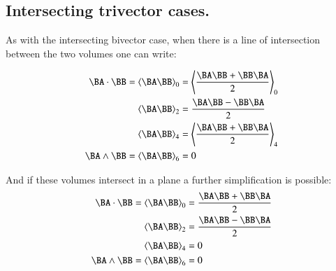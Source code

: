 \subsection{Intersecting trivector cases. }

As with the intersecting bivector case, when there is a line of intersection between the two volumes one can
write:

\begin{align*}
\BA \cdot \BB = \gpgrade{\BA\BB}{0} &= \gpgrade{\frac{\BA\BB + \BB\BA}{2}}{0} \\
\gpgrade{\BA\BB}{2} &= \frac{\BA\BB - \BB\BA}{2} \\
\gpgrade{\BA\BB}{4} &= \gpgrade{\frac{\BA\BB + \BB\BA}{2}}{4} \\
\BA \wedge \BB = \gpgrade{\BA\BB}{6} &= 0 \\
\end{align*}

And if these volumes intersect in a plane a further simplification is possible:
\begin{align*}
\BA \cdot \BB = \gpgrade{\BA\BB}{0} &= \frac{\BA\BB + \BB\BA}{2} \\
\gpgrade{\BA\BB}{2} &= \frac{\BA\BB - \BB\BA}{2} \\
\gpgrade{\BA\BB}{4} &= 0 \\
\BA \wedge \BB = \gpgrade{\BA\BB}{6} &= 0 \\
\end{align*}

